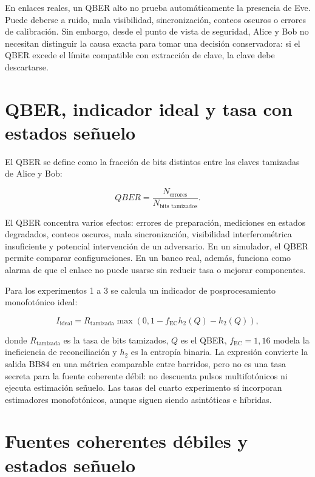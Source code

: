 En enlaces reales, un QBER alto no prueba automáticamente la presencia de Eve. Puede deberse a ruido, mala visibilidad, sincronización, conteos oscuros o errores de calibración. Sin embargo, desde el punto de vista de seguridad, Alice y Bob no necesitan distinguir la causa exacta para tomar una decisión conservadora: si el QBER excede el límite compatible con extracción de clave, la clave debe descartarse.

\section{QBER, indicador ideal y tasa con estados señuelo}

El QBER se define como la fracción de bits distintos entre las claves tamizadas de Alice y Bob:

\begin{equation}
  QBER = \frac{N_\text{errores}}{N_\text{bits tamizados}}.
  \label{eq:qber}
\end{equation}

El QBER concentra varios efectos: errores de preparación, mediciones en estados degradados, conteos oscuros, mala sincronización, visibilidad interferométrica insuficiente y potencial intervención de un adversario. En un simulador, el QBER permite comparar configuraciones. En un banco real, además, funciona como alarma de que el enlace no puede usarse sin reducir tasa o mejorar componentes.

Para los experimentos 1 a 3 se calcula un indicador de posprocesamiento monofotónico ideal:

\begin{equation}
  I_\text{ideal} = R_\text{tamizada}
  \max\left(0, 1 - f_\text{EC} h_2(Q) - h_2(Q)\right),
  \label{eq:indicador_ideal}
\end{equation}

donde \(R_\text{tamizada}\) es la tasa de bits tamizados, \(Q\) es el QBER, \(f_\text{EC}=1{,}16\) modela la ineficiencia de reconciliación y \(h_2\) es la entropía binaria. La expresión convierte la salida BB84 en una métrica comparable entre barridos, pero no es una tasa secreta para la fuente coherente débil: no descuenta pulsos multifotónicos ni ejecuta estimación señuelo. Las tasas del cuarto experimento sí incorporan estimadores monofotónicos, aunque siguen siendo asintóticas e híbridas.

\section{Fuentes coherentes débiles y estados señuelo}

